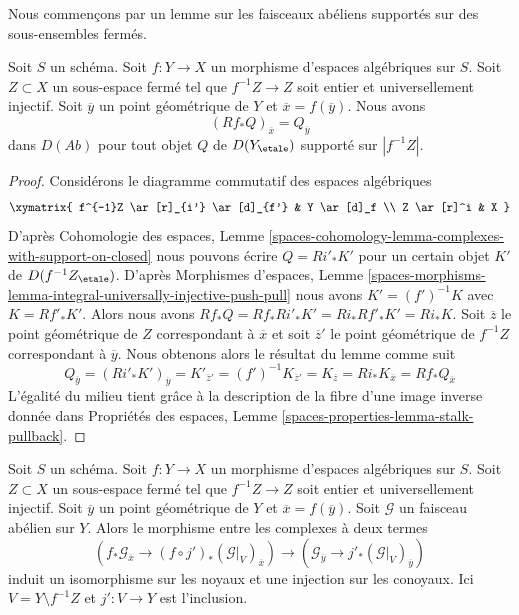 \medskip\noindent
Nous commençons par un lemme sur les faisceaux abéliens supportés sur des sous-ensembles fermés.

\begin{lemma}
\label{lemma-stalk-pushforward-with-support}
Soit $S$ un schéma. Soit $f : Y \to X$ un morphisme d'espaces algébriques
sur $S$. Soit $Z \subset X$ un sous-espace fermé tel que $f^{-1}Z \to Z$ soit
entier et universellement injectif. Soit $\overline{y}$ un point géométrique
de $Y$ et $\overline{x} = f(\overline{y})$. Nous avons
$$
(Rf_*Q)_{\overline{x}} = Q_{\overline{y}}
$$
dans $D(\textit{Ab})$ pour tout objet $Q$ de $D(Y_\etale)$ supporté
sur $|f^{-1}Z|$.
\end{lemma}

\begin{proof}
Considérons le diagramme commutatif des espaces algébriques
$$
\xymatrix{
f^{-1}Z \ar[r]_{i'} \ar[d]_{f'} & Y \ar[d]_f \\
Z \ar[r]^i & X
}
$$
D'après Cohomologie des espaces, Lemme
\ref{spaces-cohomology-lemma-complexes-with-support-on-closed} nous pouvons écrire
$Q = Ri'_*K'$ pour un certain objet $K'$ de $D(f^{-1}Z_\etale)$.
D'après Morphismes d'espaces, Lemme
\ref{spaces-morphisms-lemma-integral-universally-injective-push-pull}
nous avons $K' = (f')^{-1}K$ avec $K = Rf'_*K'$.
Alors nous avons $Rf_*Q = Rf_*Ri'_*K' = Ri_*Rf'_*K' = Ri_*K$.
Soit $\overline{z}$ le point géométrique de $Z$ correspondant à $\overline{x}$ et soit $\overline{z}'$ le point géométrique de $f^{-1}Z$ correspondant à $\overline{y}$. Nous obtenons alors le résultat du lemme comme suit
$$
Q_{\overline{y}} = (Ri'_*K')_{\overline{y}} = K'_{\overline{z}'} =
(f')^{-1}K_{\overline{z}'} = K_{\overline{z}} = Ri_*K_{\overline{x}} =
Rf_*Q_{\overline{x}}
$$
L'égalité du milieu tient grâce à la description de la fibre d'une image inverse donnée dans Propriétés des espaces, Lemme \ref{spaces-properties-lemma-stalk-pullback}.
\end{proof}

\begin{lemma}
\label{lemma-stalk-formal-glueing}
Soit $S$ un schéma. Soit $f : Y \to X$ un morphisme d'espaces algébriques sur $S$. Soit $Z \subset X$ un sous-espace fermé tel que $f^{-1}Z \to Z$ soit entier et universellement injectif. Soit $\overline{y}$ un point géométrique de $Y$ et $\overline{x} = f(\overline{y})$. Soit $\mathcal{G}$ un faisceau abélien sur $Y$. Alors le morphisme entre les complexes à deux termes $$
\left(f_*\mathcal{G}_{\overline{x}} \to
(f \circ j')_*(\mathcal{G}|_V)_{\overline{x}}\right)
\longrightarrow
\left(\mathcal{G}_{\overline{y}} \to j'_*(\mathcal{G}|_V)_{\overline{y}}\right)
$$ induit un isomorphisme sur les noyaux et une injection sur les conoyaux. Ici $V = Y \setminus f^{-1}Z$ et $j' : V \to Y$ est l'inclusion.
\end{lemma}


